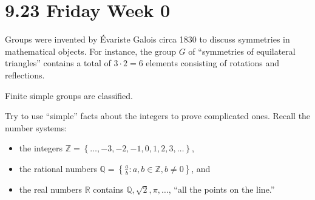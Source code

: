 \documentclass{notes}
\begin{document}
\section{9.23 Friday Week 0}

Groups were invented by Évariste Galois circa 1830 to discuss symmetries in mathematical objects.
For instance, the group $G$ of ``symmetries of equilateral triangles'' contains a total of $3 \cdot 2 = 6$ elements consisting of rotations and reflections.

\begin{thm}[20th Century]
  Finite simple groups are classified.
\end{thm}

\underline{}

Try to use ``simple'' facts about the integers to prove complicated ones.
Recall the number systems: 
\begin{itemize}
  \item the integers $\mathbb Z = \left \{ \dots, -3, -2, -1, 0, 1, 2, 3, \dots \right \}$, 

  \item the rational numbers $\mathbb Q = \left \{ \frac{a}{b} : a, b \in \mathbb Z, b \neq 0 \right \}$, and 

  \item the real numbers $\mathbb R$ contains $\mathbb Q, \sqrt 2, \pi, \dots$, ``all the points on the line.''
\end{itemize}
\end{document}
